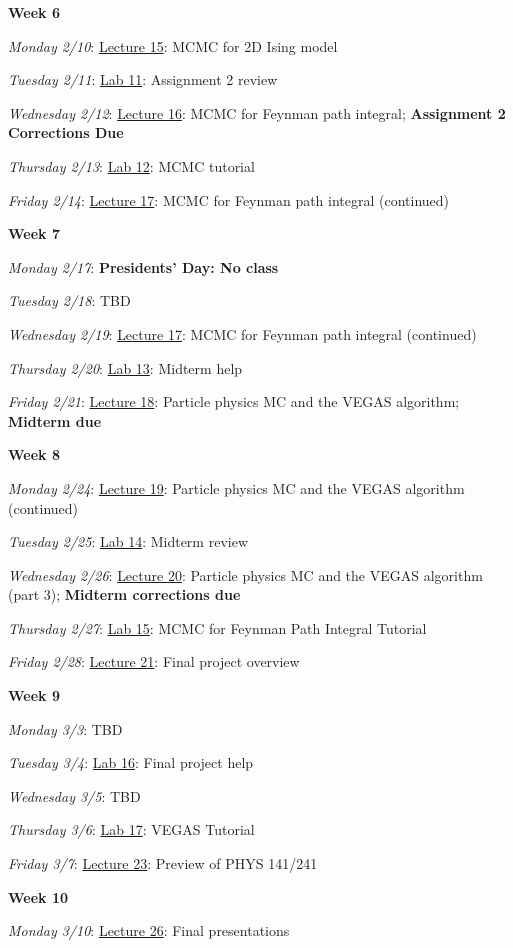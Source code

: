 \documentclass[12pt]{article}
\begin{document}
\noindent\textbf{Week 6}

\emph{Monday 2/10}:  \underline{Lecture 15}: MCMC for 2D Ising model

\emph{Tuesday 2/11}: \underline{Lab 11}: Assignment 2 review

\emph{Wednesday 2/12}: \underline{Lecture 16}: MCMC for Feynman path integral; \textbf{Assignment 2 Corrections Due}

\emph{Thursday 2/13}: \underline{Lab 12}: MCMC tutorial

\emph{Friday 2/14}: \underline{Lecture 17}: MCMC for Feynman path integral (continued)

\noindent\textbf{Week 7}

\emph{Monday 2/17}: \textbf{Presidents' Day: No class}

\emph{Tuesday 2/18}: TBD

\emph{Wednesday 2/19}: \underline{Lecture 17}: MCMC for Feynman path integral (continued)

\emph{Thursday 2/20}: \underline{Lab 13}: Midterm help

\emph{Friday 2/21}: \underline{Lecture 18}: Particle physics MC and the VEGAS algorithm; \textbf{Midterm due}

\noindent\textbf{Week 8}

\emph{Monday 2/24}: \underline{Lecture 19}: Particle physics MC and the VEGAS algorithm (continued)

\emph{Tuesday 2/25}: \underline{Lab 14}: Midterm review

\emph{Wednesday 2/26}: \underline{Lecture 20}: Particle physics MC and the VEGAS algorithm (part 3); \textbf{Midterm corrections due}

\emph{Thursday 2/27}: \underline{Lab 15}: MCMC for Feynman Path Integral Tutorial

\emph{Friday 2/28}: \underline{Lecture 21}: Final project overview

\noindent\textbf{Week 9}

\emph{Monday 3/3}: TBD

\emph{Tuesday 3/4}: \underline{Lab 16}: Final project help

\emph{Wednesday 3/5}: TBD

\emph{Thursday 3/6}: \underline{Lab 17}: VEGAS Tutorial

\emph{Friday 3/7}: \underline{Lecture 23}: Preview of PHYS 141/241

\noindent\textbf{Week 10}

\emph{Monday 3/10}: \underline{Lecture 26}: Final presentations
\end{document}
